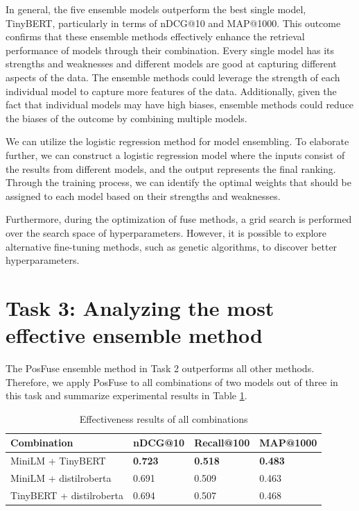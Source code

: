 \documentclass[acmsmall]{acmart}
\begin{document}
In general, the five ensemble models outperform the best single model, TinyBERT, particularly in terms of nDCG@10 and MAP@1000. This outcome confirms that these ensemble methods effectively enhance the retrieval performance of models through their combination. Every single model has its strengths and weaknesses and different models are good at capturing different aspects of the data. The ensemble methods could leverage the strength of each individual model to capture more features of the data. Additionally, given the fact that individual models may have high biases, ensemble methods could reduce the biases of the outcome by combining multiple models. 

We can utilize the logistic regression method for model ensembling. To elaborate further, we can construct a logistic regression model where the inputs consist of the results from different models, and the output represents the final ranking. Through the training process, we can identify the optimal weights that should be assigned to each model based on their strengths and weaknesses.

Furthermore, during the optimization of fuse methods, a grid search is performed over the search space of hyperparameters. However, it is possible to explore alternative fine-tuning methods, such as genetic algorithms, to discover better hyperparameters.

\section{Task 3: Analyzing the most effective ensemble method}
The PosFuse ensemble method in Task 2 outperforms all other methods. Therefore, we apply PosFuse to all combinations of two models out of three in this task and summarize experimental results in Table \ref{tab:results-task3}.
\begin{table}[!ht]
    \centering
    \caption{Effectiveness results of all combinations}
    \label{tab:results-task3}
    \begin{tabular}{llll}
       \toprule
       \textbf{Combination} & \textbf{nDCG@10} & \textbf{Recall@100} & \textbf{MAP@1000}\\
       \midrule
       MiniLM + TinyBERT & \textbf{0.723} & \textbf{0.518} & \textbf{0.483}\\
       MiniLM + distilroberta & 0.691 & 0.509 & 0.463\\
       TinyBERT + distilroberta & 0.694 & 0.507 & 0.468\\
       \bottomrule
    \end{tabular}
\end{table}
\end{document}
